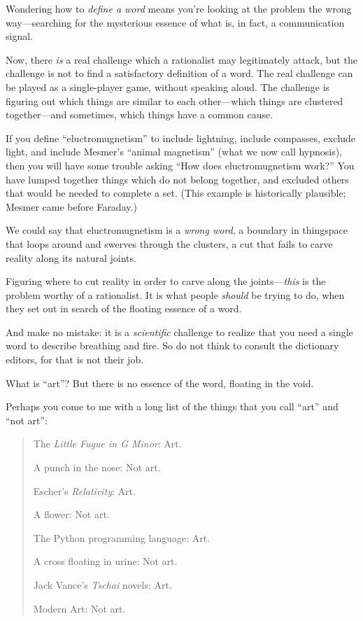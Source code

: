 {
 Wondering how to \textit{define a word} means
you're looking at the problem the wrong way---searching
for the mysterious essence of what is, in fact, a communication
signal.}

{
 Now, there \textit{is} a real challenge which a rationalist may
legitimately attack, but the challenge is not to find a satisfactory
definition of a word. The real challenge can be played as a
single-player game, without speaking aloud. The challenge is figuring
out which things are similar to each other---which things are clustered
together---and sometimes, which things have a common cause.}

{
 If you define
``eluctromugnetism'' to include
lightning, include compasses, exclude light, and include
Mesmer's ``animal
magnetism'' (what we now call hypnosis), then you
will have some trouble asking ``How does
eluctromugnetism work?'' You have lumped together
things which do not belong together, and excluded others that would be
needed to complete a set. (This example is historically plausible;
Mesmer came before Faraday.)}

{
 We could say that eluctromugnetism is a \textit{wrong word}, a
boundary in thingspace that loops around and swerves through the
clusters, a cut that fails to carve reality along its natural joints.}

{
 Figuring where to cut reality in order to carve along the
joints---\textit{this} is the problem worthy of a rationalist. It is
what people \textit{should} be trying to do, when they set out in
search of the floating essence of a word.}

{
 And make no mistake: it is a \textit{scientific} challenge to
realize that you need a single word to describe breathing and fire. So
do not think to consult the dictionary editors, for that is not their
job.}

{
 What is ``art''? But there is
no essence of the word, floating in the void.}

{
 Perhaps you come to me with a long list of the things that you
call ``art'' and
``not art'':}

\begin{quote}
{
 The \textit{Little Fugue in G Minor}: Art.}

{
 A punch in the nose: Not art.}

{
 Escher's \textit{Relativity}: Art.}

{
 A flower: Not art.}

{
 The Python programming language: Art.}

{
 A cross floating in urine: Not art.}

{
 Jack Vance's \textit{Tschai} novels: Art.}

{
  Modern Art: Not art.}
\end{quote}

